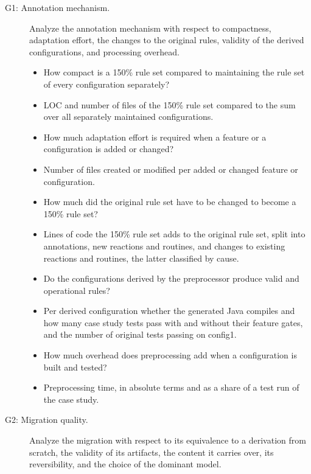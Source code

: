 \begin{description}
      \item[G1: Annotation mechanism.] \label{gqm:G1} Analyze the annotation mechanism with respect to compactness, adaptation effort, the changes to the original rules, validity of the derived configurations, and processing overhead.
            \begin{itemize}
                  \item[Q1.1] How compact is a 150\% rule set compared to maintaining the rule set of every configuration separately?
                  \item[M1.1] LOC and number of files of the 150\% rule set compared to the sum over all separately maintained configurations.
                  \item[Q1.2] How much adaptation effort is required when a feature or a configuration is added or changed?
                  \item[M1.2] Number of files created or modified per added or changed feature or configuration.
                  \item[Q1.3] How much did the original rule set have to be changed to become a 150\% rule set?
                  \item[M1.3] Lines of code the 150\% rule set adds to the original rule set, split into annotations, new reactions and routines, and changes to existing reactions and routines, the latter classified by cause.
                  \item[Q1.4] Do the configurations derived by the preprocessor produce valid and operational rules?
                  \item[M1.4] Per derived configuration whether the generated Java compiles and how many case study tests pass with and without their feature gates, and the number of original tests passing on config1.
                  \item[Q1.5] How much overhead does preprocessing add when a configuration is built and tested?
                  \item[M1.5] Preprocessing time, in absolute terms and as a share of a test run of the case study.
            \end{itemize}
      \item[G2: Migration quality.] \label{gqm:G2} Analyze the migration with respect to its equivalence to a derivation from scratch, the validity of its artifacts, the content it carries over, its reversibility, and the choice of the dominant model.
            \begin{itemize}

\end{itemize}
\end{description}
